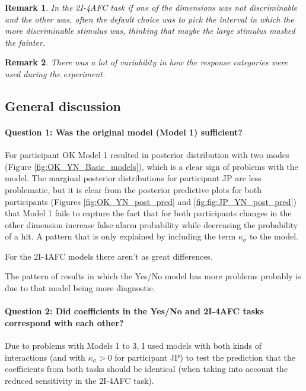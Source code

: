 \documentclass{article}\usepackage{knitr}
\newtheorem{remark}{Remark}
\begin{document}
\begin{remark}
In the 2I-4AFC task if one of the dimensions was not discriminable and the other was, often the default choice was to pick the interval in which the more discriminable stimulus was, thinking that maybe the large stimulus masked the fainter.
\end{remark}

\begin{remark}
There was a lot of variability in how the response categories were used during the experiment.
\end{remark}

\subsection{General discussion}

\paragraph{Question 1: Was the original model (Model 1) sufficient?}

For participant OK Model 1 resulted in posterior distribution with two modes (Figure \ref{fig:OK_YN_Basic_models}), which is a clear sign of problems with the model. The marginal posterior distributions for participant JP are less problematic, but it is clear from the posterior predictive plots for both participants (Figures \ref{fig:OK_YN_post_pred} and \ref{fig:fig:JP_YN_post_pred}) that Model 1 fails to capture the fact that for both participants changes in the other dimension increase false alarm probability while decreasing the probability of a  hit. A pattern that is only explained by including the term $\kappa_{\sigma}$ to the model. 

For the 2I-4AFC models there aren't as great differences. 

The pattern of results in which the Yes/No model has more problems probably is due to that model being more diagnostic.    

\paragraph{Question 2: Did coefficients in the Yes/No and 2I-4AFC tasks correspond with each other?}

Due to problems with Models 1 to 3, I used models with both kinds of interactions (and with $\kappa_{\sigma} > 0$ for participant JP) to test the prediction that the coefficients from both tasks should be identical (when taking into account the reduced sensitivity in the 2I-4AFC task).
\end{document}
